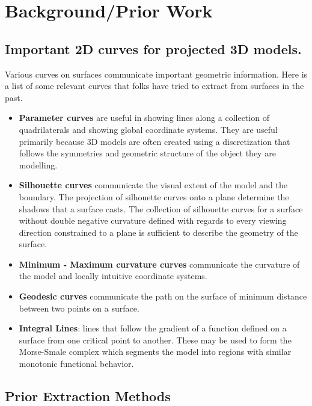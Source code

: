 \documentclass[12pt, letterpaper]{article}
\begin{document}
\newpage

\section{Background/Prior Work}

	\subsection{Important 2D curves for projected 3D models.}

		Various curves on surfaces communicate important geometric information. Here is a list of some relevant curves that folks have
		tried to extract from surfaces in the past.

\begin{itemize}
	\item 	\textbf{Parameter curves} are useful in showing lines along a collection of quadrilaterals and showing global coordinate systems.
			They are useful primarily because 3D models are often created using a discretization that follows the symmetries and geometric structure
			of the object they are modelling.
	\item 	\textbf{Silhouette curves} communicate the visual extent of the model and the boundary.
			The projection of silhouette curves onto a plane determine the shadows that a surface casts.
			The collection of silhouette curves for a surface without double negative curvature defined with regards to every viewing direction constrained to a plane
			is sufficient to describe the geometry of the surface.
	\item 	\textbf{Minimum - Maximum curvature curves} communicate the curvature of the model and locally intuitive coordinate systems.
	\item        \textbf{Geodesic curves} communicate the path on the surface of minimum distance between two points on a surface.
	\item 	\textbf{Integral Lines}: lines that follow the gradient of a function defined on a surface from one critical point to another. These may be used to form the Morse-Smale complex
			which segments the model into regions with similar monotonic functional behavior.
\end{itemize}

	\subsection{Prior Extraction Methods}
\end{document}
